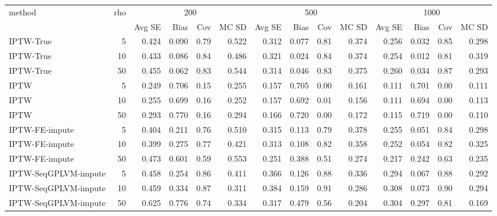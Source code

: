 \begin{tabular}{l r|rrrr|rrrr|rrrr}
\toprule
method & rho & \multicolumn{4}{c|}{200} & \multicolumn{4}{c|}{500} & \multicolumn{4}{c}{1000} \\
 &  & Avg SE & Bias & Cov & MC SD & Avg SE & Bias & Cov & MC SD & Avg SE & Bias & Cov & MC SD \\
\midrule
IPTW-True & 5 & 0.424 & 0.090 & 0.79 & 0.522 & 0.312 & 0.077 & 0.81 & 0.374 & 0.256 & 0.032 & 0.85 & 0.298 \\
IPTW-True & 10 & 0.433 & 0.086 & 0.84 & 0.486 & 0.321 & 0.024 & 0.84 & 0.374 & 0.254 & 0.012 & 0.81 & 0.319 \\
IPTW-True & 50 & 0.455 & 0.062 & 0.83 & 0.544 & 0.314 & 0.046 & 0.83 & 0.375 & 0.260 & 0.034 & 0.87 & 0.293 \\
IPTW & 5 & 0.249 & 0.706 & 0.15 & 0.255 & 0.157 & 0.705 & 0.00 & 0.161 & 0.111 & 0.701 & 0.00 & 0.111 \\
IPTW & 10 & 0.255 & 0.699 & 0.16 & 0.252 & 0.157 & 0.692 & 0.01 & 0.156 & 0.111 & 0.694 & 0.00 & 0.113 \\
IPTW & 50 & 0.293 & 0.770 & 0.16 & 0.294 & 0.166 & 0.720 & 0.00 & 0.172 & 0.115 & 0.719 & 0.00 & 0.110 \\
IPTW-FE-impute & 5 & 0.404 & 0.211 & 0.76 & 0.510 & 0.315 & 0.113 & 0.79 & 0.378 & 0.255 & 0.051 & 0.84 & 0.298 \\
IPTW-FE-impute & 10 & 0.399 & 0.275 & 0.77 & 0.421 & 0.313 & 0.108 & 0.82 & 0.358 & 0.252 & 0.054 & 0.82 & 0.325 \\
IPTW-FE-impute & 50 & 0.473 & 0.601 & 0.59 & 0.553 & 0.251 & 0.388 & 0.51 & 0.274 & 0.217 & 0.242 & 0.63 & 0.235 \\
IPTW-SeqGPLVM-impute & 5 & 0.458 & 0.254 & 0.86 & 0.411 & 0.366 & 0.126 & 0.88 & 0.336 & 0.294 & 0.067 & 0.88 & 0.292 \\
IPTW-SeqGPLVM-impute & 10 & 0.459 & 0.334 & 0.87 & 0.311 & 0.384 & 0.159 & 0.91 & 0.286 & 0.308 & 0.073 & 0.90 & 0.294 \\
IPTW-SeqGPLVM-impute & 50 & 0.625 & 0.776 & 0.74 & 0.334 & 0.317 & 0.479 & 0.56 & 0.204 & 0.304 & 0.297 & 0.81 & 0.169 \\
\bottomrule
\end{tabular}